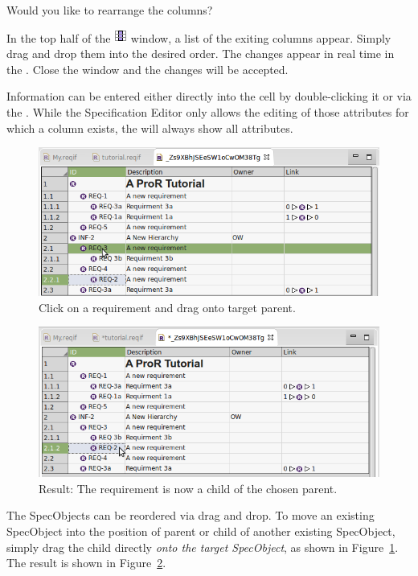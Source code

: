 \begin{info}
Would you like to rearrange the columns?

In the top half of the  {\includegraphics[scale=0.6]{../rmf-images/icons/full/obj16/Column.png}} window, a list of the exiting columns appear. Simply drag and drop them into the desired order. The changes appear in real time in the . Close the window and the changes will be accepted.
\end{info}

Information can be entered either directly into the cell by double-clicking it or via the .  While the Specification Editor only allows the editing of those attributes for which a column exists, the  will always show all attributes.

\begin{figure}
  \centering
  \includegraphics[width=0.8\linewidth]{../rmf-images/hierarchy_step_1.png}
  \caption{Click on a requirement and drag onto target parent.}
  \label{fig:hierarchy_step_1}
\end{figure}
\begin{figure}
  \centering
  \includegraphics[width=0.8\linewidth]{../rmf-images/hierarchy_step_2.png}
  \caption{Result: The requirement is now a child of the chosen parent.}
  \label{fig:hierarchy_step_2}
\end{figure}

The SpecObjects can be reordered via drag and drop.  To move an existing SpecObject into the position of parent or child of another existing SpecObject, simply drag the child directly \textit{onto the target SpecObject}, as shown in Figure~\ref{fig:hierarchy_step_1}. The result is shown in Figure~\ref{fig:hierarchy_step_2}. 

